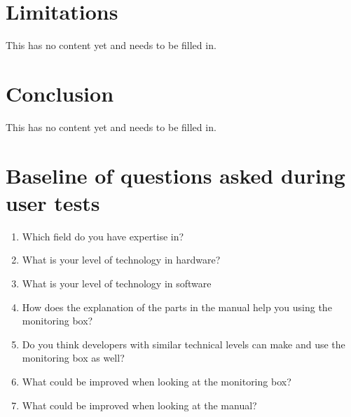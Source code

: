 \documentclass[conference]{IEEEtran}
\begin{document}
\section{Limitations}
This has no content yet and needs to be filled in. 

\section{Conclusion}
This has no content yet and needs to be filled in. 



\appendices
\section{Baseline of questions asked during user tests}
\begin{enumerate}
\item Which field do you have expertise in?
\item What is your level of technology in hardware?
\item What is your level of technology in software
\item How does the explanation of the parts in the manual help you using the monitoring box?
\item Do you think developers with similar technical levels can make and use the monitoring box as well?\item What could be improved when looking at the monitoring box?
\item What could be improved when looking at the manual?
\end{enumerate}
\end{document}
